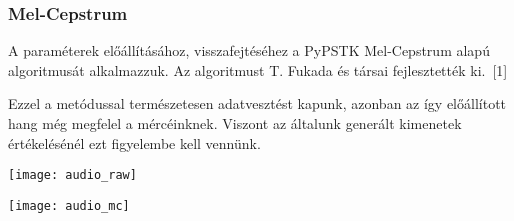 \subsubsection{Mel-Cepstrum}
A paraméterek előállításához, visszafejtéséhez a PyPSTK Mel-Cepstrum alapú algoritmusát alkalmazzuk. Az algoritmust T. Fukada és társai fejlesztették ki.\ [1]

Ezzel a metódussal természetesen adatvesztést kapunk, azonban az így előállított hang még megfelel a mércéinknek. Viszont az általunk generált kimenetek értékelésénél ezt figyelembe kell vennünk.

\texttt{[image: audio\_raw]}

\texttt{[image: audio\_mc]}